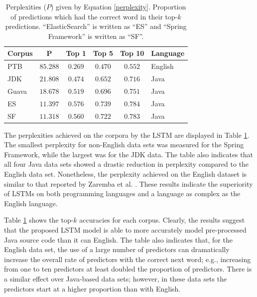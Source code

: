 \documentclass[runningheads,a4paper]{llncs}
\newcommand{\tabhorzspacing}{0.5em}
\newcommand{\tabvertspacing}{1.1}
\begin{document}
\begin{table}[t]
    \caption{Perplexities ($P$) given by Equation \ref{perplexity}.
    Proportion of predictions which had the correct
    word in their top-$k$ predictions.
    ``ElasticSearch'' is written as ``ES'' and ``Spring
    Framework'' is written as ``SF''.}
    \label{topk-table}
    \vskip 0.15in
    \begin{center}
    \setlength{\tabcolsep}{\tabhorzspacing}
    {\renewcommand{\arraystretch}{\tabvertspacing}
    \begin{tabular}{lccccl}
    \hline
    Corpus & P & Top 1 & Top 5 & Top 10 & Language \\
    \hline
    PTB   & $85.288$ & $0.269$ & $0.470$ & $0.552$ & English \\
    JDK   & $21.808$ & $0.474$ & $0.652$ & $0.716$ & Java \\
    Guava & $18.678$ & $0.519$ & $0.696$ & $0.751$ & Java \\
    ES    & $11.397$ & $0.576$ & $0.739$ & $0.784$ & Java \\
    SF    & $11.318$ & $0.560$ & $0.722$ & $0.783$ & Java \\
    \hline
    \end{tabular}}
    \end{center}
    \vskip -0.1in
\end{table}

The perplexities achieved on the corpora by the LSTM are displayed in
Table \ref{topk-table}. The smallest perplexity for non-English data sets 
was measured for the Spring Framework, while the largest was for the JDK data. 
The table also indicates that all four Java data sets showed a drastic 
reduction in perplexity compared to the English data set. Nonetheless, the 
perplexity achieved on the English dataset is similar to that reported by 
Zaremba et al. \cite{Zaremba}. These results indicate the superiority of LSTMs on both
programming languages and a language as complex as the English language.

Table \ref{topk-table} shows the top-$k$ accuracies for each corpus.
Clearly, the results suggest that the proposed LSTM model is able to more
accurately model pre-processed Java source code than it can English. The table
also indicates that, for the English data set, the use of a large number of
predictors can dramatically increase the overall rate of predictors with the
correct next word; e.g., increasing from one to ten predictors at least doubled
the proportion of predictors. There is a similar effect over Java-based data
sets; however, in these data sets the predictors start at a higher proportion
than with English.
\end{document}
